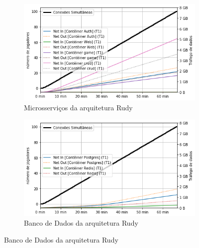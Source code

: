 \begin{figure}[htb!]
    \caption{Consumo de rede das arquiteturas}
    \label{fig:experimento_net}

    \begin{subfigure}{.5\textwidth}
        \centering
        \includegraphics[width=.95\linewidth]{figuras/testes/r_net_game.png}
        \caption{Microsserviços da arquitetura Rudy}
        \label{fig:r_net_game}
    \end{subfigure}%
    \begin{subfigure}{.5\textwidth}
        \centering
        \includegraphics[width=.95\linewidth]{figuras/testes/r_net_db.png}
        \caption{Banco de Dados da arquitetura Rudy}
        \label{fig:r_net_db}
    \end{subfigure}%


\end{figure}
